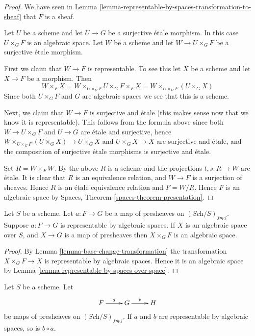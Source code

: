 \begin{proof}
We have seen in
Lemma \ref{lemma-representable-by-spaces-transformation-to-sheaf}
that $F$ is a sheaf.

\medskip\noindent
Let $U$ be a scheme and let $U \to G$ be a surjective \'etale morphism.
In this case $U \times_G F$ is an algebraic space. Let $W$ be a scheme
and let $W \to U \times_G F$ be a surjective \'etale morphism.

\medskip\noindent
First we claim that $W \to F$ is representable.
To see this let $X$ be a scheme and let $X \to F$ be a morphism.
Then
$$
W \times_F X = W \times_{U \times_G F} U \times_G F \times_F X
= W \times_{U \times_G F} (U \times_G X)
$$
Since both $U \times_G F$ and $G$ are algebraic spaces we see that
this is a scheme.

\medskip\noindent
Next, we claim that $W \to F$ is surjective and \'etale (this makes
sense now that we know it is representable). This follows from the
formula above since both $W \to U \times_G F$ and $U \to G$
are \'etale and surjective, hence
$W \times_{U \times_G F} (U \times_G X) \to U \times_G X$ and
$U \times_G X \to X$ are surjective and \'etale, and the composition of
surjective \'etale morphisms is surjective and \'etale.

\medskip\noindent
Set $R = W \times_F W$. By the above $R$ is a scheme and
the projections $t, s : R \to W$
are \'etale. It is clear that $R$ is an equivalence relation, and
$W \to F$ is a surjection of sheaves. Hence $R$ is an \'etale equivalence
relation and $F = W/R$. Hence $F$ is an algebraic space by
Spaces,
Theorem \ref{spaces-theorem-presentation}.
\end{proof}


\begin{lemma}
\label{lemma-representable-by-spaces}
Let $S$ be a scheme.
Let $a : F \to G$ be a map of presheaves on $(\textit{Sch}/S)_{fppf}$.
Suppose $a : F \to G$ is representable by algebraic spaces.
If $X$ is an algebraic space over $S$, and $X \to G$ is a map of presheaves
then $X \times_G F$ is an algebraic space.
\end{lemma}

\begin{proof}
By Lemma \ref{lemma-base-change-transformation} the transformation
$X \times_G F \to X$ is representable by algebraic spaces. Hence it is
an algebraic space by
Lemma \ref{lemma-representable-by-spaces-over-space}.
\end{proof}

\begin{lemma}
\label{lemma-composition-transformation}
Let $S$ be a scheme.
Let
$$
\xymatrix{
F \ar[r]^a & G \ar[r]^b & H
}
$$
be maps of presheaves on $(\textit{Sch}/S)_{fppf}$.
If $a$ and $b$ are representable by algebraic spaces, so is
$b \circ a$.
\end{lemma}

